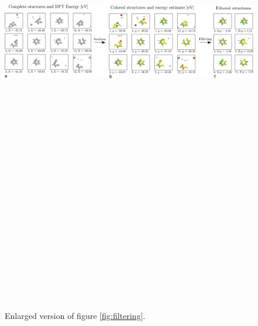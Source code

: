 \begin{figure}
	\includegraphics[angle=90, height=24cm]{graphics/filtering_demo.pdf}
	\caption{Enlarged version of figure \ref{fig:filtering}.}
	\label{fig:App_Filtering}
\end{figure}